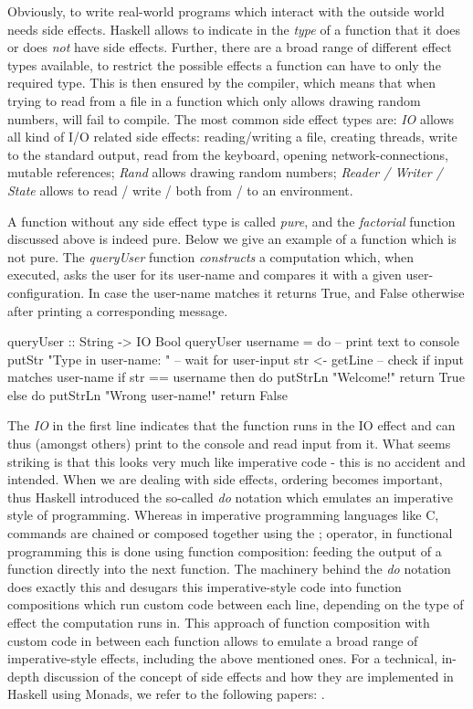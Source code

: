 Obviously, to write real-world programs which interact with the outside world needs side effects. Haskell allows to indicate in the \textit{type} of a function that it does or does \textit{not} have side effects. Further, there are a broad range of different effect types available, to restrict the possible effects a function can have to only the required type. This is then ensured by the compiler, which means that when trying to read from a file in a function which only allows drawing random numbers, will fail to compile. The most common side effect types are: \textit{IO} allows all kind of I/O related side effects: reading/writing a file, creating threads, write to the standard output, read from the keyboard, opening network-connections, mutable references; \textit{Rand}  allows drawing random numbers; \textit{Reader / Writer / State} allows to read / write / both from / to an environment.

A function without any side effect type is called \textit{pure}, and the \textit{factorial} function discussed above is indeed pure. Below we give an example of a function which is not pure. The \textit{queryUser} function \textit{constructs} a computation which, when executed, asks the user for its user-name and compares it with a given user-configuration. In case the user-name matches it returns True, and False otherwise after printing a corresponding message. 

\begin{HaskellCode}
queryUser :: String -> IO Bool
queryUser username = do
  -- print text to console
  putStr "Type in user-name: "
  -- wait for user-input
  str <- getLine
  -- check if input matches user-name
  if str == username
    then do
      putStrLn "Welcome!"			
      return True
    else do
      putStrLn "Wrong user-name!"
      return False
\end{HaskellCode}

The \textit{IO} in the first line indicates that the function runs in the IO effect and can thus (amongst others) print to the console and read input from it. What seems striking is that this looks very much like imperative code - this is no accident and intended. When we are dealing with side effects, ordering becomes important, thus Haskell introduced the so-called \textit{do} notation which emulates an imperative style of programming. Whereas in imperative programming languages like C, commands are chained or composed together using the ; operator, in functional programming this is done using function composition: feeding the output of a function directly into the next function. The machinery behind the \textit{do} notation does exactly this and desugars this imperative-style code into function compositions which run custom code between each line, depending on the type of effect the computation runs in. This approach of function composition with custom code in between each function allows to emulate a broad range of imperative-style effects, including the above mentioned ones. For a technical, in-depth discussion of the concept of side effects and how they are implemented in Haskell using Monads, we refer to the following papers: \cite{jones_tackling_2002,moggi_computational_1989,wadler_essence_1992,wadler_monads_1995,wadler_how_1997}.

